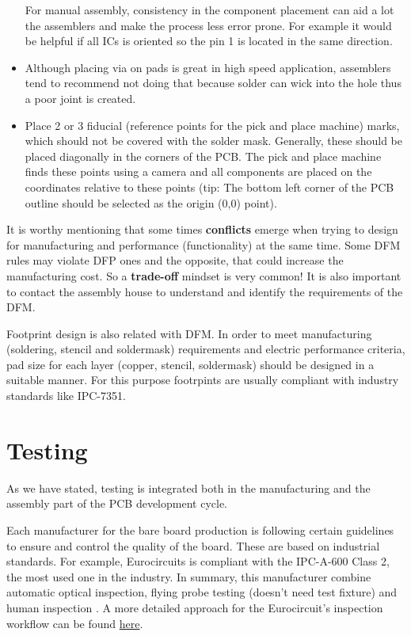 \documentclass[final]{cubedoc}
\begin{document}
\begin{itemize}
		For manual assembly, consistency in the component placement can aid a lot the assemblers and make the process less error prone. For example it would be helpful if all ICs is oriented so the pin 1 is located in the same direction.
		
		
		\item Although placing via on pads is great in high speed application, assemblers tend to recommend not doing that because solder can wick into the hole thus a poor joint is created.
		
		
		\item Place 2 or 3 fiducial (reference points for the pick and place machine) marks, which should not be covered with the solder mask. Generally, these should be placed diagonally in the corners of the PCB. The pick and place machine finds these points using a camera and all components are placed on the coordinates relative to these points (tip: The bottom left corner of the PCB outline should be selected as the origin (0,0) point). 
		
	\end{itemize}
	
	It is worthy mentioning that some times \textbf{conflicts} emerge when trying to design for manufacturing and performance (functionality) at the same time. Some DFM rules may violate DFP ones and the opposite, that could increase the manufacturing cost. So a \textbf{trade-off} mindset is very common! It is also important to contact the assembly house to understand and identify the requirements of the DFM.
	
	
	Footprint design is also related with DFM. In order to meet manufacturing (soldering, stencil and soldermask) requirements and electric performance criteria, pad size for each layer (copper, stencil, soldermask) should be designed in a suitable manner. For this purpose footrpints are usually compliant with industry standards like IPC-7351.
	
	\section{Testing}
	
	As we have stated, testing is integrated both in the manufacturing and the assembly part of the PCB development cycle.
	
	Each manufacturer for the bare board production is following certain guidelines to ensure and control the quality of the board. These are based on industrial standards. For example, Eurocircuits is compliant with the IPC-A-600 Class 2, the most used one in the industry. In summary, this manufacturer combine  automatic optical inspection, flying probe testing (doesn't need test fixture) and human inspection \cite{eurocircuits:stepbystep}. A more detailed approach for the Eurocircuit's inspection workflow can be found \href{https://web.archive.org/web/20200814201544/https://www.eurocircuits.com/blog/how-do-we-assure-the-quality-of-your-pcb-part-1/}{here}.
	
\end{document}

